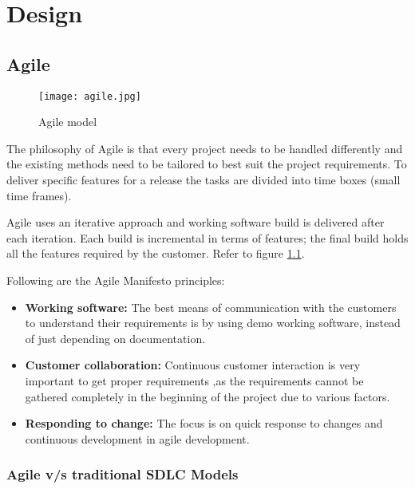 \chapter{Design}

\section{Agile}

\begin{figure}[h!]
    \begin{center}
        \texttt{[image: agile.jpg]}
    \end{center}
    \caption{Agile model}
    \label{fig:agile}
\end{figure}

The philosophy of Agile is that every project needs to be handled differently and the existing methods
need to be tailored to best suit the project requirements. To deliver specific features for a 
release the tasks are divided into time boxes (small time frames).

Agile uses an iterative approach and  working software build is delivered after each iteration. 
Each build is incremental in terms of features; the final build holds all the features required 
by the customer. Refer to figure \ref{fig:agile}.

Following are the Agile Manifesto principles:

\begin{itemize}
    \item \textbf{Working software:} The best means of communication with the customers to understand
    their requirements is by using demo working software, instead of just depending on documentation.
     
    \item \textbf{Customer collaboration:} Continuous customer interaction is very important to get proper
    requirements ,as the requirements cannot be gathered completely in the beginning of the project due 
    to various factors.

    \item \textbf{Responding to change:} The focus is on quick response to changes and 
    continuous development in agile development.
\end{itemize}

\subsection{Agile v/s traditional SDLC Models}

